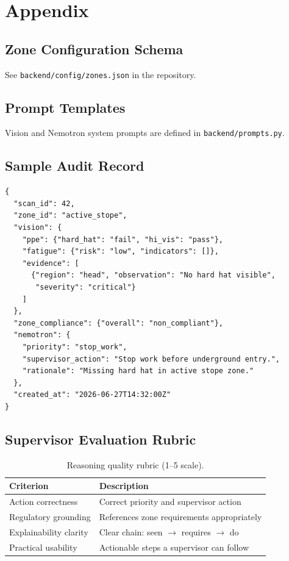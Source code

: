 \section{Appendix}

\subsection{Zone Configuration Schema}

See \texttt{backend/config/zones.json} in the repository.

\subsection{Prompt Templates}

Vision and Nemotron system prompts are defined in \texttt{backend/prompts.py}.

\subsection{Sample Audit Record}

\begin{lstlisting}[basicstyle=\small\ttfamily, breaklines=true]
{
  "scan_id": 42,
  "zone_id": "active_stope",
  "vision": {
    "ppe": {"hard_hat": "fail", "hi_vis": "pass"},
    "fatigue": {"risk": "low", "indicators": []},
    "evidence": [
      {"region": "head", "observation": "No hard hat visible",
       "severity": "critical"}
    ]
  },
  "zone_compliance": {"overall": "non_compliant"},
  "nemotron": {
    "priority": "stop_work",
    "supervisor_action": "Stop work before underground entry.",
    "rationale": "Missing hard hat in active stope zone."
  },
  "created_at": "2026-06-27T14:32:00Z"
}
\end{lstlisting}

\subsection{Supervisor Evaluation Rubric}

\begin{table}[htbp]
  \centering
  \caption{Reasoning quality rubric (1--5 scale).}
  \begin{tabular}{@{}ll@{}}
    \toprule
    Criterion & Description \\
    \midrule
    Action correctness & Correct priority and supervisor action \\
    Regulatory grounding & References zone requirements appropriately \\
    Explainability clarity & Clear chain: seen $\rightarrow$ requires $\rightarrow$ do \\
    Practical usability & Actionable steps a supervisor can follow \\
    \bottomrule
  \end{tabular}
\end{table}

